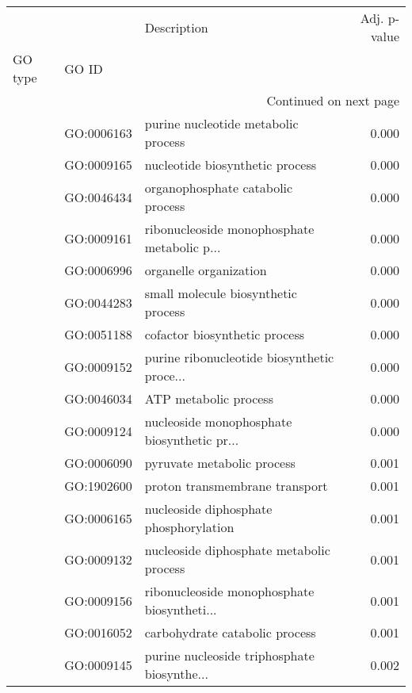 \begin{longtable}{lllr}
\toprule
   &            &                                  Description &  Adj. p-value \\
GO type & GO ID &                                              &               \\
\midrule
\endhead
\midrule
\multicolumn{4}{r}{{Continued on next page}} \\
\midrule
\endfoot

\bottomrule
\endlastfoot
\multirow{74}{*}{BP} & GO:0006163 &          purine nucleotide metabolic process &         0.000 \\
   & GO:0009165 &              nucleotide biosynthetic process &         0.000 \\
   & GO:0046434 &            organophosphate catabolic process &         0.000 \\
   & GO:0009161 &  ribonucleoside monophosphate metabolic p... &         0.000 \\
   & GO:0006996 &                       organelle organization &         0.000 \\
   & GO:0044283 &          small molecule biosynthetic process &         0.000 \\
   & GO:0051188 &                cofactor biosynthetic process &         0.000 \\
   & GO:0009152 &  purine ribonucleotide biosynthetic proce... &         0.000 \\
   & GO:0046034 &                        ATP metabolic process &         0.000 \\
   & GO:0009124 &  nucleoside monophosphate biosynthetic pr... &         0.000 \\
   & GO:0006090 &                   pyruvate metabolic process &         0.001 \\
   & GO:1902600 &               proton transmembrane transport &         0.001 \\
   & GO:0006165 &       nucleoside diphosphate phosphorylation &         0.001 \\
   & GO:0009132 &     nucleoside diphosphate metabolic process &         0.001 \\
   & GO:0009156 &  ribonucleoside monophosphate biosyntheti... &         0.001 \\
   & GO:0016052 &               carbohydrate catabolic process &         0.001 \\
   & GO:0009145 &  purine nucleoside triphosphate biosynthe... &         0.002 \\

\end{longtable}
